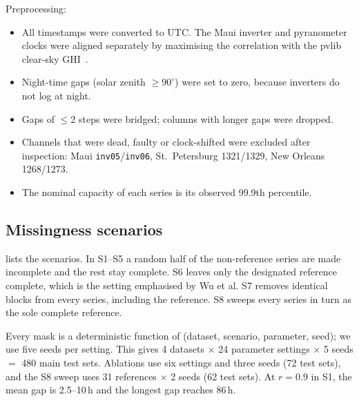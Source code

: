 \documentclass[11pt,a4paper]{article}
\newcommand{\tabdir}{../tables/en}
\begin{document}
Preprocessing:
\begin{itemize}
  \item All timestamps were converted to UTC. The Maui inverter and pyranometer clocks were aligned separately by maximising the correlation with the pvlib clear-sky GHI~\cite{holmgren2018pvlib,ineichen2002}.
  \item Night-time gaps (solar zenith $\ge 90^\circ$) were set to zero, because inverters do not log at night.
  \item Gaps of $\le$2 steps were bridged; columns with longer gaps were dropped.
  \item Channels that were dead, faulty or clock-shifted were excluded after inspection: Maui \texttt{inv05}/\texttt{inv06}, St.\ Petersburg 1321/1329, New Orleans 1268/1273.
  \item The nominal capacity of each series is its observed 99.9th percentile.
\end{itemize}

\begin{table}[t]
  \centering\small
  \caption{Datasets. All windows are fully observed after night filling. ``Ref.'' is the designated reference used by S6 and FPRM-ref.}
  \label{tab:datasets}
  \resizebox{\linewidth}{!}{}
\end{table}

\subsection{Missingness scenarios}

 lists the scenarios.
In S1--S5 a random half of the non-reference series are made incomplete and the rest stay complete.
S6 leaves only the designated reference complete, which is the setting emphasised by Wu et al.
S7 removes identical blocks from every series, including the reference.
S8 sweeps every series in turn as the sole complete reference.

Every mask is a deterministic function of (dataset, scenario, parameter, seed); we use five seeds per setting.
This gives 4 datasets $\times$ 24 parameter settings $\times$ 5 seeds $=$ 480 main test sets.
Ablations use six settings and three seeds (72 test sets), and the S8 sweep uses 31 references $\times$ 2 seeds (62 test sets).
At $r=0.9$ in S1, the mean gap is 2.5--10\,h and the longest gap reaches 86\,h.

\begin{table}[t]
  \centering\small
  \caption{Missingness scenarios. MCAR: missing completely at random; MNAR: missing not at random.}
  \label{tab:scenarios}
  \resizebox{\linewidth}{!}{}
\end{table}
\end{document}
